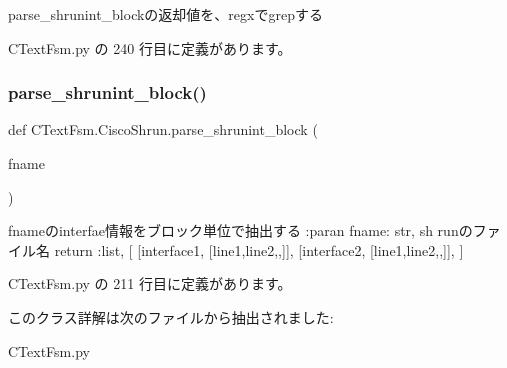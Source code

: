 \begin{DoxyVerb}parse_shrunint_blockの返却値を、regxでgrepする
\end{DoxyVerb}
 

 C\+Text\+Fsm.\+py の 240 行目に定義があります。

\mbox{\label{classCTextFsm_1_1CiscoShrun_ac2f526f3a7fab20d62f72ebf254cd294}} 
\subsubsection{\texorpdfstring{parse\_shrunint\_block()}{parse\_shrunint\_block()}}
{\footnotesize\ttfamily def C\+Text\+Fsm.\+Cisco\+Shrun.\+parse\+\_\+shrunint\+\_\+block (\begin{DoxyParamCaption}\item[{}]{fname }\end{DoxyParamCaption})\hspace{0.3cm}{\ttfamily [static]}}

\begin{DoxyVerb}fnameのinterfae情報をブロック単位で抽出する
:paran fname: str, sh runのファイル名
return :list, [
  [interface1, [line1,line2,,]],
  [interface2, [line1,line2,,]],
]
\end{DoxyVerb}
 

 C\+Text\+Fsm.\+py の 211 行目に定義があります。



このクラス詳解は次のファイルから抽出されました\+:\begin{DoxyCompactItemize}
\item 
C\+Text\+Fsm.\+py\end{DoxyCompactItemize}
